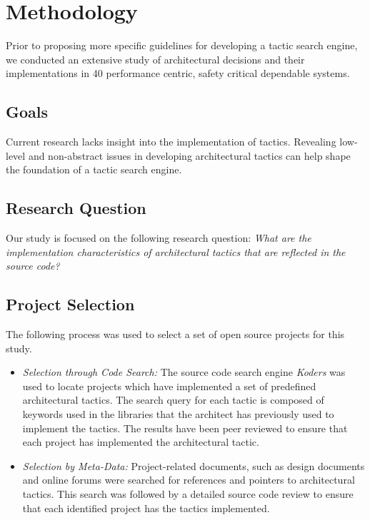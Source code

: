  \section{Methodology}
\label{sec:Method}
Prior to proposing more specific guidelines for developing a tactic search engine, we conducted an extensive study of architectural decisions and their implementations in 40 performance centric, safety critical dependable systems\cite{FSE2012}.

\subsection{Goals}
Current research lacks insight into the implementation of tactics. Revealing low-level and non-abstract issues in developing architectural tactics can help shape the foundation of a tactic search engine.

 \subsection{Research Question}
Our study is focused on the following research question: \emph{What are the implementation characteristics of architectural tactics that are reflected in the source code?}



\subsection{Project Selection}
The following process was used to select a set of open source projects for this study.

\begin{itemize}

   \setlength{\itemsep}{0pt} %
   \setlength{\parskip}{0pt} %
   \setlength{\parsep}{0pt}  %

\item \textit{Selection through Code Search:} The source code search engine \textit{Koders} was used to locate projects which have implemented a set of predefined architectural tactics. The search query for each tactic is composed of keywords used in the libraries that the architect has previously used to implement the tactics. The results have been peer reviewed to ensure that each project has implemented the architectural tactic.


\item \textit{Selection by Meta-Data:} Project-related documents, such as design documents and online forums were searched for references and pointers to architectural tactics. This search was followed by a detailed source code review to ensure that each identified project has the tactics implemented.
\end{itemize}

